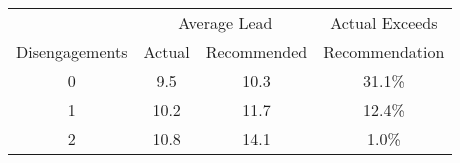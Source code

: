 \begin{tabular}{c|cc|c}
 & \multicolumn{2}{c|}{Average Lead} & Actual Exceeds\\
Disengagements & Actual & Recommended & Recommendation \\
  \hline
0 & 9.5 & 10.3 & 31.1\% \\ 
  1 & 10.2 & 11.7 & 12.4\% \\ 
  2 & 10.8 & 14.1 & 1.0\% \\ 
\end{tabular}

